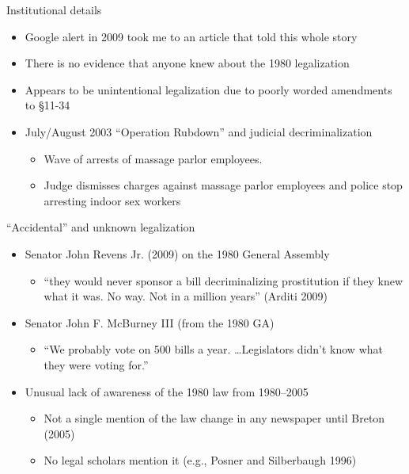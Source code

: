 \documentclass{beamer}
\begin{document}
\begin{frame}{Institutional details}

\begin{itemize}
	\item Google alert in 2009 took me to an article that told this whole story
	\item There is no evidence that anyone knew about the 1980 legalization
	\item Appears to be unintentional legalization due to poorly worded amendments to \S 11-34
	\item  July/August 2003 ``Operation Rubdown'' and judicial decriminalization
		\begin{itemize}
		\item Wave of arrests of massage parlor employees.
		\item Judge dismisses charges against massage parlor employees and police stop arresting indoor sex workers
		\end{itemize}
\end{itemize}

\end{frame}


\begin{frame}{``Accidental'' and unknown legalization}

		\begin{itemize}
		\item Senator John Revens Jr. (2009) on the 1980 General Assembly
			\begin{itemize}
			\item ``they would never sponsor a bill decriminalizing prostitution if they knew what it was.  No way.  Not in a million years'' (Arditi 2009)
			\end{itemize}
		\item Senator John F. McBurney III (from the 1980 GA) 
			\begin{itemize}
			\item ``We probably vote on 500 bills a year.  \dots Legislators didn't know what they were voting for.''
			\end{itemize}
		\item Unusual lack of awareness of the 1980 law from 1980--2005
			\begin{itemize}
			\item Not a single mention of the law change in any newspaper until Breton (2005)
			\item No legal scholars mention it (e.g., Posner and Silberbaugh 1996)
			\end{itemize}
		\end{itemize}

\end{frame}
\end{document}

